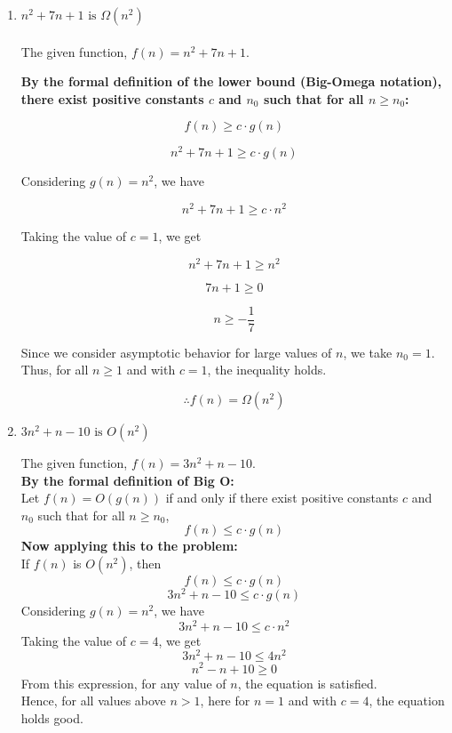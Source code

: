 \documentclass[11pt]{article}
\theoremstyle{definition}
\newcommand{\solution}{\medskip\noindent{\color{DarkBlue}\textbf{Solution:}}}
\begin{document}
\begin{enumerate}[label=(\alph*)]

\item $n^{2}+7n+1 \text { is } \Omega(n^{2})$ \\
\solution
\\

The given function, \( f(n) = n^2 + 7n + 1 \).  

\textbf{By the formal definition of the lower bound (Big-Omega notation), there exist positive constants \( c \) and \( n_0 \) such that for all \( n \geq n_0 \):}  

\[
f(n) \geq c \cdot g(n)
\]

\[
n^2 + 7n + 1 \geq c \cdot g(n)
\]

Considering \( g(n) = n^2 \), we have  

\[
n^2 + 7n + 1 \geq c \cdot n^2
\]

Taking the value of \( c = 1 \), we get  

\[
n^2 + 7n + 1 \geq n^2
\]

\[
7n + 1 \geq 0
\]

\[
n \geq -\frac{1}{7}
\]

Since we consider asymptotic behavior for large values of \( n \), we take \( n_0 = 1 \).  
Thus, for all \( n \geq 1 \) and with \( c = 1 \), the inequality holds. 

\[
\therefore f(n) = \Omega(n^2)
\]


\item $3n^{2}+n-10 \text { is } O(n^{2})$ \\
\solution

The given function, \( f(n) = 3n^2 + n - 10 \).\\
\textbf{By the formal definition of Big O:}\\
Let \( f(n) = O(g(n)) \) if and only if there exist positive constants \( c \) and \( n_0 \) such that for all \( n \geq n_0 \),
\[
f(n) \leq c \cdot g(n)
\]
\textbf{Now applying this to the problem:}\\
If \( f(n) \) is \( O(n^2) \), then  
\[
f(n) \leq c \cdot g(n)
\]
\[
3n^2 + n - 10 \leq c \cdot g(n)
\]
Considering \( g(n) = n^2 \), we have  
\[
3n^2 + n - 10 \leq c \cdot n^2
\]
Taking the value of \( c = 4 \), we get  
\[
3n^2 + n - 10 \leq 4n^2
\]
\[
n^2 - n + 10 \geq 0
\]
From this expression, for any value of \( n \), the equation is satisfied.\\
Hence, for all values above \( n > 1 \), here for \( n = 1 \) and with \( c = 4 \), the equation holds good.\\


\end{enumerate}
\end{document}

